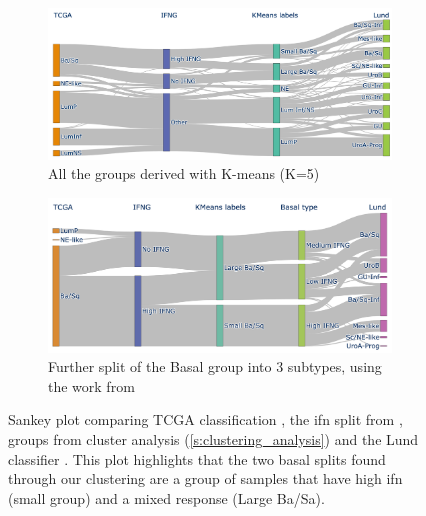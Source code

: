 \begin{figure}[!t]
    \centering
    \begin{subfigure}[!t]{1.0\textwidth}
        \includegraphics[width=1.0\textwidth,keepaspectratio]{Sections/ClusteringAnalysis/Resources/discussion/inf_comp.png}
        \caption{All the groups derived with K-means (K=5)}
        \label{fig:cs:ifn_all}
    \end{subfigure}
    \begin{subfigure}[!t]{1.0\textwidth}
        \includegraphics[width=\textwidth,keepaspectratio]{Sections/ClusteringAnalysis/Resources/discussion/inf_3_basal.png}
        \caption{Further split of the Basal group into 3 subtypes, using the work from \citet{Baker2022-bj}}
        \label{fig:cs:ifn_three_basal}
    \end{subfigure} 
    \caption[MIBC groups comparisons with previous classifications]{Sankey plot comparing TCGA classification \citep{Robertson2017-mg}, the \acrlong{ifn} split from \citet{Baker2022-bj}, groups from cluster analysis (\cref{s:clustering_analysis}) and the Lund classifier \citep{Marzouka2018-ge}. This plot highlights that the two basal splits found through our clustering are a group of samples that have high \acrshort{ifn} (small group) and a mixed response (Large Ba/Sa). }
    \label{fig:cs:ifn_comp}
\end{figure}

